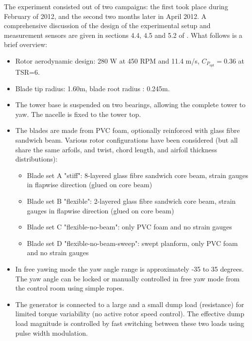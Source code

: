 \documentclass[a4paper]{jpconf}
\begin{document}

The experiment consisted out of two campaigns: the first took place during February of 2012, and the second two months later in April 2012. A comprehensive discussion of the design of the experimental setup and measurement sensors are given in sections 4.4, 4.5 and 5.2 of \cite{verelst_numerical_2013:diss}. What follows is a brief overview:

\begin{itemize}
	\item Rotor aerodynamic design: 280 W at 450 RPM and 11.4 m/s, $C_{P_{opt}}=0.36$ at TSR=6.
	\item Blade tip radius: 1.60m, blade root radius : 0.245m.
	\item The tower base is suspended on two bearings, allowing the complete tower to yaw. The nacelle is fixed to the tower top.
	\item The blades are made from PVC foam, optionally reinforced with glass fibre sandwich beam. Various rotor configurations have been considered (but all share the same arfoils, and twist, chord length, and airfoil thickness distributions):
	\begin{itemize}
		\item Blade set A "stiff": 8-layered glass fibre sandwich core beam, strain gauges in flapwise direction (glued on core beam)
		\item Blade set B "flexible": 2-layered glass fibre sandwich core beam, strain gauges in flapwise direction (glued on core beam)
		\item Blade set C "flexible-no-beam": only PVC foam and no strain gauges
		\item Blade set D "flexible-no-beam-sweep": swept planform, only PVC foam and no strain gauges
	\end{itemize}
	\item In free yawing mode the yaw angle range is approximately -35 to 35 degrees. The yaw angle can be locked or manually controlled in free yaw mode from the control room using simple ropes.
	\item The generator is connected to a large and a small dump load (resistance) for limited torque variability (no active rotor speed control). The effective dump load magnitude is controlled by fast switching between these two loads using pulse width modulation.

\end{itemize}
\end{document}
